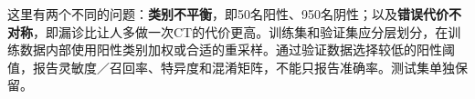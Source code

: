这里有两个不同的问题：\textbf{类别不平衡}，即50名阳性、950名阴性；以及\textbf{错误代价不对称}，即漏诊比让人多做一次CT的代价更高。训练集和验证集应分层划分，在训练数据内部使用阳性类别加权或合适的重采样。通过验证数据选择较低的阳性阈值，报告灵敏度／召回率、特异度和混淆矩阵，不能只报告准确率。测试集单独保留。
